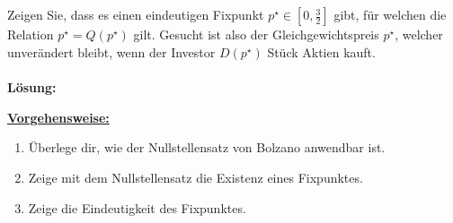 \newpage

\subsection*{}
Zeigen Sie, dass es einen eindeutigen Fixpunkt $ p^\star \in \left[0,\frac{3}{2}\right] $ gibt, für welchen die Relation $ p^\star = Q(p^\star) $ gilt.
Gesucht ist also der Gleichgewichtspreis $ p^\star $, welcher unverändert bleibt, wenn der Investor $ D(p^\star ) $ Stück Aktien kauft.
\\ \\
\textbf{Lösung:}
\begin{mdframed}
\underline{\textbf{Vorgehensweise:}}
\renewcommand{\labelenumi}{\theenumi.}
\begin{enumerate}
\item Überlege dir, wie der Nullstellensatz von Bolzano anwendbar ist.
\item Zeige mit dem Nullstellensatz die Existenz eines Fixpunktes.
\item Zeige die Eindeutigkeit des Fixpunktes.
\end{enumerate}
\end{mdframed}

